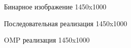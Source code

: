\documentclass{report}
\begin{document}
\begin{figure}[H]
\caption{Бинарное изображение 1450x1000}
\end{figure}

\begin{figure}[H]
\caption{Последовательная реализация 1450x1000}
\end{figure}

\begin{figure}[H]
\caption{OMP реализация 1450x1000}
\end{figure}
\end{document}
